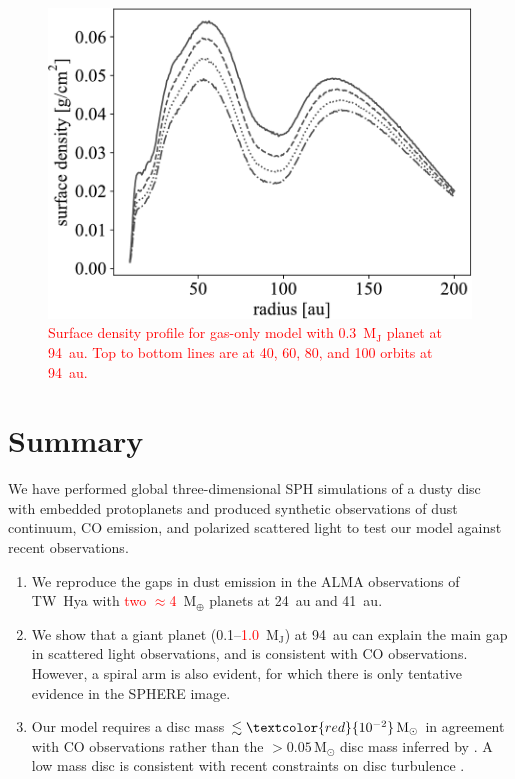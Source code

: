 \documentclass[usenatbib,a4paper,times]{mnras}
\renewcommand{\sun}{\mathrm{M}_{\odot}}
\renewcommand{\earth}{\mathrm{M}_{\oplus}}
\newcommand{\new}[1]{{\textcolor{red}{#1}}}
\begin{document}
\begin{figure}
   \begin{center}
      \includegraphics[width=1.00\columnwidth]{figs/gap.pdf}
      \caption{\new{Surface density profile for gas-only model with
         0.3~$\mathrm{M_J}$ planet at 94~au. Top to bottom lines are at 40, 60,
         80, and 100 orbits at 94~au.\label{fig:gap}}}
   \end{center}
\end{figure}









\section{Summary}
\label{sec:summary}

We have performed global three-dimensional SPH simulations of a dusty disc with
embedded protoplanets and produced synthetic observations of dust continuum, CO
emission, and polarized scattered light to test our model against recent
observations.

\begin{enumerate}
   \item We reproduce the gaps in dust emission in the ALMA observations of
      TW~Hya with \new{two $\approx$4}~$\earth{}$ planets at 24~au and 41~au.
   \item We show that a giant planet (0.1--\new{1.0}~$\mathrm{M_J}$) at 94~au
      can explain the main gap in scattered light observations, and is
      consistent with CO observations. However, a spiral arm is also evident,
      for which there is only tentative evidence in the SPHERE image.
   \item Our model requires a disc mass $\lesssim\new{10^{-2}}\,\sun{}$ in
      agreement with CO observations rather than the $>0.05\,\sun{}$ disc mass
      inferred by \citet{bergin:2013}. A low mass disc is consistent with recent
      constraints on disc turbulence \citep{flaherty:2018}.
\end{enumerate}
\end{document}
